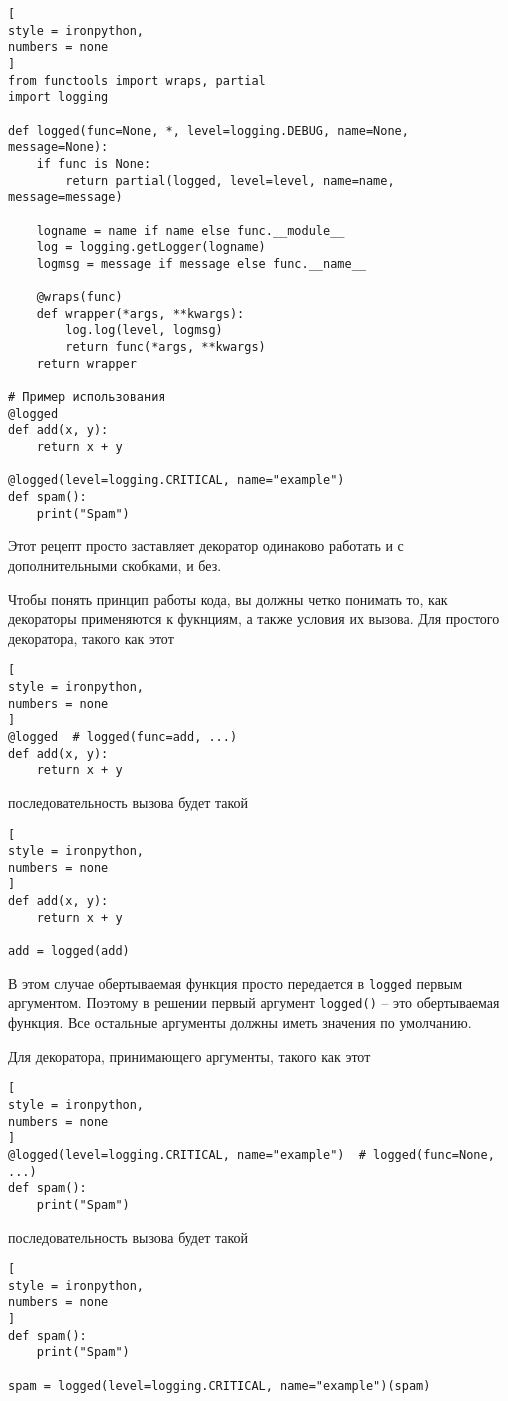 \documentclass[%
	11pt,
	a4paper,
	utf8,
		]{article}
\begin{document}
\begin{lstlisting}[
style = ironpython,
numbers = none
]
from functools import wraps, partial
import logging

def logged(func=None, *, level=logging.DEBUG, name=None, message=None):
    if func is None:
        return partial(logged, level=level, name=name, message=message)
        
    logname = name if name else func.__module__
    log = logging.getLogger(logname)
    logmsg = message if message else func.__name__
    
    @wraps(func)
    def wrapper(*args, **kwargs):
        log.log(level, logmsg)
        return func(*args, **kwargs)
    return wrapper
    
# Пример использования
@logged
def add(x, y):
    return x + y
    
@logged(level=logging.CRITICAL, name="example")
def spam():
    print("Spam")
\end{lstlisting}

Этот рецепт просто заставляет декоратор одинаково работать и с дополнительными скобками, и без.

Чтобы понять принцип работы кода, вы должны четко понимать то, как декораторы применяются к фукнциям, а также условия их вызова. Для простого декоратора, такого как этот
\begin{lstlisting}[
style = ironpython,
numbers = none
]
@logged  # logged(func=add, ...)
def add(x, y):
    return x + y
\end{lstlisting}
последовательность вызова будет такой
\begin{lstlisting}[
style = ironpython,
numbers = none
]
def add(x, y):
    return x + y
    
add = logged(add)
\end{lstlisting}

В этом случае обертываемая функция просто передается в \texttt{logged} первым аргументом. Поэтому в решении первый аргумент \texttt{logged()} -- это обертываемая функция. Все остальные аргументы должны иметь значения по умолчанию.

Для декоратора, принимающего аргументы, такого как этот
\begin{lstlisting}[
style = ironpython,
numbers = none
]
@logged(level=logging.CRITICAL, name="example")  # logged(func=None, ...)
def spam():
    print("Spam")
\end{lstlisting}
последовательность вызова будет такой
\begin{lstlisting}[
style = ironpython,
numbers = none
]
def spam():
    print("Spam")

spam = logged(level=logging.CRITICAL, name="example")(spam)
\end{lstlisting}
\end{document}
